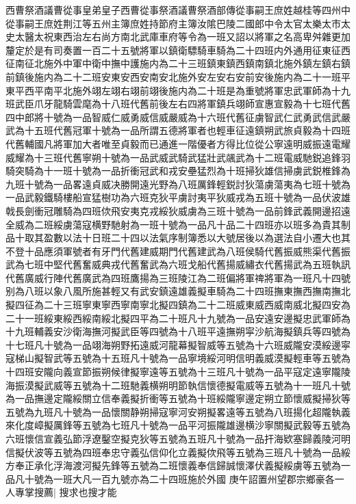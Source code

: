 {西曹祭酒議曹從事皇弟皇子西曹從事祭酒議曹祭酒部傳從事嗣王庶姓越桂等四州中從事嗣王庶姓荆江等五州主簿庶姓持節府主簿汝隂巴陵二國郎中令太官太樂太市太史太醫太祝東西治左右尚方南北武庫車府等令為一班又詔以將軍之名高卑舛雜更加釐定於是有司奏置一百二十五號將軍以鎮衛驃騎車騎為二十四班内外通用征東征西征南征北施外中軍中衛中撫中護施内為二十三班鎮東鎮西鎮南鎮北施外鎮左鎮右鎮前鎮後施内為二十二班安東安西安南安北施外安左安右安前安後施内為二十一班平東平西平南平北施外翊左翊右翊前翊後施内為二十班是為重號將軍忠武軍師為十九班武臣爪牙龍騎雲麾為十八班代舊前後左右四將軍鎮兵翊師宣惠宣毅為十七班代舊四中郎將十號為一品智威仁威勇威信威嚴威為十六班代舊征虜智武仁武勇武信武嚴武為十五班代舊冠軍十號為一品所謂五德將軍者也輕車征遠鎮朔武旅貞毅為十四班代舊輔國凡將軍加大者唯至貞毅而已通進一階優者方得比位從公寧遠明威振遠電耀威耀為十三班代舊寧朔十號為一品武威武騎武猛壯武飊武為十二班電威馳鋭追鋒羽騎突騎為十一班十號為一品折衝冠武和戎安壘猛烈為十班掃狄雄信掃虜武鋭椎鋒為九班十號為一品畧遠貞威决勝開遠光野為八班厲鋒輕鋭討狄蕩虜蕩夷為七班十號為一品武毅鐵騎樓船宣猛樹功為六班克狄平虜討夷平狄威戎為五班十號為一品伏波雄戟長劍衝冠雕騎為四班佽飛安夷克戎綏狄威虜為三班十號為一品前鋒武義開邊招遠全威為二班綏虜蕩寇横野馳射為一班十號為一品凡十品二十四班亦以班多為貴其制品十取其盈數以法十日班二十四以法氣序制簿悉以大號居後以為選法自小遷大也其不登十品應須軍號者有牙門代舊建威期門代舊建武為八班侯騎代舊振威熊渠代舊振武為七班中堅代舊奮威典戎代舊奮武為六班戈船代舊揚威繡衣代舊揚武為五班執訊代舊廣威行陣代舊廣武為四班鷹揚為三班陵江為二班偏將軍禆將軍為一班凡十四號别為八班以象八風所施甚輕又有武安鎮遠雄義擬車騎為二十四班撫東撫西撫南撫北擬四征為二十三班寧東寧西寧南寧北擬四鎮為二十二班威東威西威南威北擬四安為二十一班綏東綏西綏南綏北擬四平為二十班凡十九號為一品安遠安邊擬忠武軍師為十九班輔義安沙衛海撫河擬武臣等四號為十八班平遠撫朔寜沙航海擬鎮兵等四號為十七班凡十號為一品翊海朔野拓遠威河龍幕擬智威等五號為十六班威隴安漠綏邊寜寇梯山擬智武等五號為十五班凡十號為一品寧境綏河明信明義威漠擬輕車等五號為十四班安隴向義宣節振朔候律擬寧遠等五號為十三班凡十號為一品平寇定遠寧隴陵海振漠擬武威等五號為十二班馳義横朔明節執信懷德擬電威等五號為十一班凡十號為一品撫邊定隴綏關立信奉義擬折衝等五號為十班綏隴寧邊定朔立節懷威擬掃狄等五號為九班凡十號為一品懷關静朔掃寇寧河安朔擬畧遠等五號為八班揚化超隴執義來化度嶂擬厲鋒等五號為七班凡十號為一品平河振隴雄邊横沙寧關擬武毅等五號為六班懷信宣義弘節浮遼鑿空擬克狄等五號為五班凡十號為一品扞海欵塞歸義陵河明信擬伏波等五號為四班奉忠守義弘信仰化立義擬佽飛等五號為三班凡十號為一品綏方奉正承化浮海渡河擬先鋒等五號為二班懷義奉信歸誠懷澤伏義擬綏虜等五號為一品凡十號為一班大凡一百九號亦為二十四班施於外國}
庚午詔置州望郡宗鄉豪各一人專掌搜薦|{
	搜求也搜才能}


